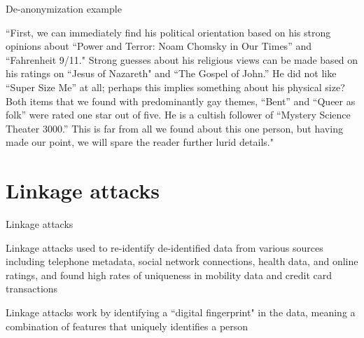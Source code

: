 \documentclass[12pt,aspectratio=169,handout]{beamer}
\begin{document}
\begin{frame}{De-anonymization example}

``First, we can immediately find his political orientation based on his strong opinions about ``Power and Terror: Noam Chomsky in Our Times'' and ``Fahrenheit 9/11." Strong guesses about his religious views can be made based on his ratings on ``Jesus of Nazareth" and ``The Gospel of John.'' He did not like ``Super Size Me'' at all; perhaps this implies something about his physical size? Both items that we found with predominantly gay themes, ``Bent'' and ``Queer as folk'' were rated one star out of five. He is a cultish follower of ``Mystery Science Theater 3000.'' This is far from all we found about this one person, but having made our point, we will spare the reader further lurid details."


\end{frame}


\section{Linkage attacks}


\begin{frame}{Linkage attacks}

Linkage attacks used to re-identify de-identified data from various sources including telephone metadata, social network connections, health data, and online ratings, and found high rates of uniqueness in mobility data and credit card transactions

Linkage attacks work by identifying a ``digital fingerprint" in the data, meaning a combination of features that uniquely identifies a person



\end{frame}
\end{document}
